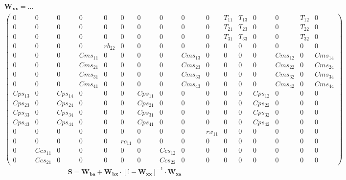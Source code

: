 \begin{multline*} \mathbf{W_{xx}} =\ldots\\ \left(\begin{smallmatrix} 0 & 0 & 0 & 0 & 0 & 0 &
0 & 0 & 0 & 0 & T_{11} & T_{13} & 0 & 0 & T_{12} & 0 \\ 0 & 0 & 0 & 0
& 0 & 0 & 0 & 0 & 0 & 0 & T_{21} & T_{23} & 0 & 0 & T_{22} & 0 \\ 0 &
0 & 0 & 0 & 0 & 0 & 0 & 0 & 0 & 0 & T_{31} & T_{33} & 0 & 0 & T_{32} &
0 \\ 0 & 0 & 0 & 0 & rb_{22} & 0 & 0 & 0 & 0 & 0 & 0 & 0 & 0 & 0 & 0 &
0 \\ 0 & 0 & 0 & Cms_{11} & 0 & 0 & 0 & 0 & Cms_{13} & 0 & 0 & 0 & 0 &
Cms_{12} & 0 & Cms_{14} \\ 0 & 0 & 0 & Cms_{21} & 0 & 0 & 0 & 0 &
Cms_{23} & 0 & 0 & 0 & 0 & Cms_{22} & 0 & Cms_{24} \\ 0 & 0 & 0 &
Cms_{31} & 0 & 0 & 0 & 0 & Cms_{33} & 0 & 0 & 0 & 0 & Cms_{32} & 0 &
Cms_{34} \\ 0 & 0 & 0 & Cms_{41} & 0 & 0 & 0 & 0 & Cms_{43} & 0 & 0 &
0 & 0 & Cms_{42} & 0 & Cms_{44} \\ Cps_{13} & 0 & Cps_{14} & 0 & 0 & 0
& Cps_{11} & 0 & 0 & 0 & 0 & 0 & Cps_{12} & 0 & 0 & 0 \\ Cps_{23} & 0
& Cps_{24} & 0 & 0 & 0 & Cps_{21} & 0 & 0 & 0 & 0 & 0 & Cps_{22} & 0 &
0 & 0 \\ Cps_{33} & 0 & Cps_{34} & 0 & 0 & 0 & Cps_{31} & 0 & 0 & 0 &
0 & 0 & Cps_{32} & 0 & 0 & 0 \\ Cps_{43} & 0 & Cps_{44} & 0 & 0 & 0 &
Cps_{41} & 0 & 0 & 0 & 0 & 0 & Cps_{42} & 0 & 0 & 0 \\ 0 & 0 & 0 & 0 &
0 & 0 & 0 & 0 & 0 & rx_{11} & 0 & 0 & 0 & 0 & 0 & 0 \\ 0 & 0 & 0 & 0 &
0 & rc_{11} & 0 & 0 & 0 & 0 & 0 & 0 & 0 & 0 & 0 & 0 \\ 0 & Ccs_{11} &
0 & 0 & 0 & 0 & 0 & Ccs_{12} & 0 & 0 & 0 & 0 & 0 & 0 & 0 & 0 \\ 0 &
Ccs_{21} & 0 & 0 & 0 & 0 & 0 & Ccs_{22} & 0 & 0 & 0 & 0 & 0 & 0 & 0 &
0 \end{smallmatrix}\right)\end{multline*}
\[ \mathbf{S}=\mathbf{W_{ba}}+\mathbf{W_{bx}}\cdot\left[ \mathbb{I}
-\mathbf{W_{xx}}\right]^{-1}\cdot\mathbf{W_{xa}} \]
